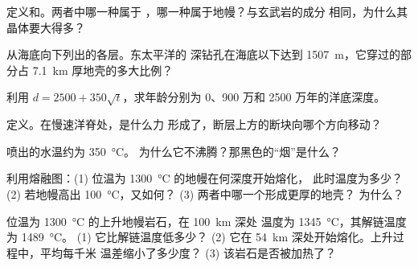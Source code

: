 \begin{exercise}[$\star$]\label{exo:g11:ocean-ridges:1}
定义和。两者中哪一种属于
，哪一种属于地幔？与玄武岩的成分
相同，为什么其晶体要大得多？
\end{exercise}

\begin{exercise}[$\star$]\label{exo:g11:ocean-ridges:2}
从海底向下列出的各层。东太平洋的
深钻孔在海底以下达到 \qty{1507}{m}，它穿过的部分占
\qty{7.1}{km} 厚地壳的多大比例？
\end{exercise}

\begin{exercise}[$\star$]\label{exo:g11:ocean-ridges:3}
利用 $d = 2500 + 350\sqrt{t}$，求年龄分别为
0、900 万和 2500 万年的洋底深度。
\end{exercise}

\begin{exercise}[$\star$]\label{exo:g11:ocean-ridges:4}
定义。在慢速洋脊处，是什么力
形成了，断层上方的断块向哪个方向移动？
\end{exercise}

\begin{exercise}[$\star$]\label{exo:g11:ocean-ridges:5}
喷出的水温约为 \qty{350}{\celsius}。
为什么它不沸腾？那黑色的“烟”是什么？
\end{exercise}

\begin{exercise}[$\star\star$]\label{exo:g11:ocean-ridges:6}
利用熔融图：(1) 位温为 \qty{1300}{\celsius} 的地幔在何深度开始熔化，
此时温度为多少？(2) 若地幔高出 \qty{100}{\celsius}，又如何？
(3) 两者中哪一个形成更厚的地壳？
为什么？
\end{exercise}

\begin{exercise}[$\star\star$]\label{exo:g11:ocean-ridges:7}
位温为 \qty{1300}{\celsius} 的上升地幔岩石，在 \qty{100}{km} 深处
温度为 \qty{1345}{\celsius}，其解链温度为 \qty{1489}{\celsius}。
(1) 它比解链温度低多少？
(2) 它在 \qty{54}{km} 深处开始熔化。上升过程中，平均每千米
温差缩小了多少度？
(3) 该岩石是否被加热了？
\end{exercise}

